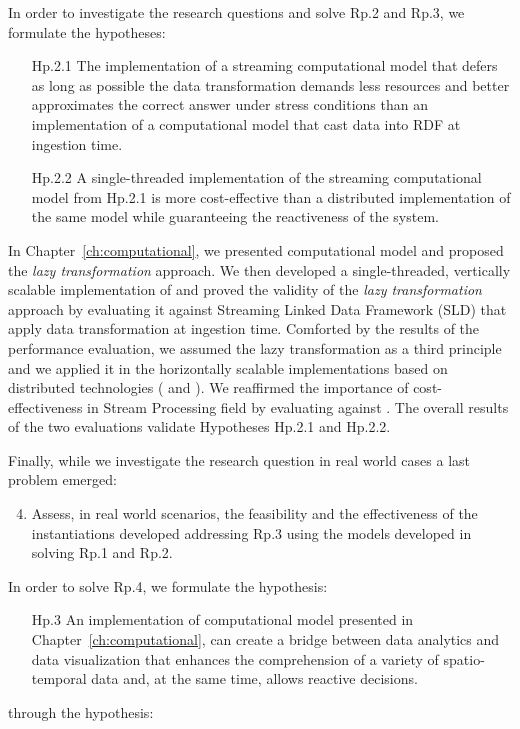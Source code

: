 In order to investigate the research questions and solve \textsf{Rp.2} and \textsf{Rp.3}, we formulate the hypotheses: 
\begin{itemize}[leftmargin=42pt]
\item[\textsf{Hp.2.1}] The implementation of a streaming computational model that defers as long as possible the data transformation demands less resources and better approximates the correct answer under stress conditions than an implementation of a computational model that cast data into RDF at ingestion time.
\item[\textsf{Hp.2.2}] A single-threaded implementation of the streaming computational model from \textsf{Hp.2.1} is more cost-effective than a distributed implementation of the same model while guaranteeing the reactiveness of the system.
\end{itemize}

In Chapter~\ref{ch:computational}, we presented \river{} computational model and proposed the \textit{lazy transformation} approach.
We then developed \sti{} a single-threaded, vertically scalable implementation of \river{} and proved the validity of the \textit{lazy transformation} approach by evaluating it against Streaming Linked Data Framework (SLD) that apply data transformation at ingestion time.
Comforted by the results of the performance evaluation, we assumed the \textsf{lazy transformation} as a third principle and we applied it in the horizontally scalable implementations based on distributed technologies (\sparkdi{} and \hivedi{}).
We reaffirmed the importance of cost-effectiveness in Stream Processing field by evaluating \sti{} against \sparkdi{}.
The overall results of the two evaluations validate Hypotheses \textsf{Hp.2.1} and \textsf{Hp.2.2}.

Finally, while we investigate the research question in real world cases a last problem emerged:
\begin{enumerate}[leftmargin=32pt,label=\textsf{Rp.\arabic*}]
\setcounter{enumi}{3}
\item Assess, in real world scenarios, the feasibility and the effectiveness of the instantiations developed addressing \textsf{Rp.3} using the models developed in solving \textsf{Rp.1} and \textsf{Rp.2}.
\end{enumerate}

In order to solve \textsf{Rp.4}, we formulate the hypothesis:
\begin{itemize}[leftmargin=42pt]
\item[\textsf{Hp.3}] An implementation of \river{} computational model presented in Chapter~\ref{ch:computational}, can create a bridge between data analytics and data visualization that enhances the comprehension of a variety of spatio-temporal data and, at the same time, allows reactive decisions.
\end{itemize} through the hypothesis:

